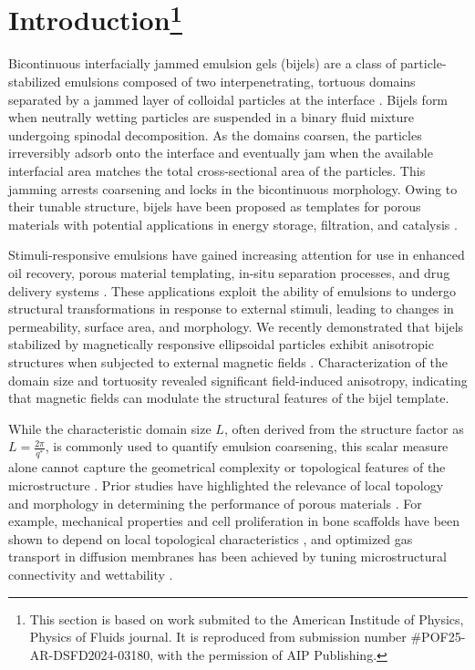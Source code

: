\section[Introduction]{Introduction\protect\footnote{This section is based on work submited to the American Institude of Physics, Physics of Fluids journal.
                        It is reproduced from submission number \#POF25-AR-DSFD2024-03180, with the permission of AIP Publishing.}}

Bicontinuous interfacially jammed emulsion gels (bijels) are a class of particle-stabilized emulsions composed of two interpenetrating, tortuous domains separated by a jammed layer of colloidal particles 
at the interface \cite{stratford_colloidal_2005, herzig_bicontinuous_2007, tavacoli_novel_2011}. Bijels form when neutrally wetting particles are suspended in a binary fluid mixture undergoing spinodal 
decomposition. As the domains coarsen, the particles irreversibly adsorb onto the interface and eventually jam when the available interfacial area matches the total cross-sectional area of the particles. 
This jamming arrests coarsening and locks in the bicontinuous morphology. Owing to their tunable structure, bijels have been proposed as templates for porous materials with potential applications in 
energy storage, filtration, and catalysis \cite{yabuno_preparation_2020, samdani_bicontinuous_2017, cha_bicontinuous_2019, garcia_scalable_2019, santiago_cordoba_aerobijels_2020}.

Stimuli-responsive emulsions have gained increasing attention for use in enhanced oil recovery, porous material templating, in-situ separation processes, and drug delivery systems 
\cite{tang_stimuli-responsive_2016, bago_rodriguez_capsules_2019, nakayama_stimuli-responsive_2018}. These applications exploit the ability of emulsions to undergo structural transformations in response 
to external stimuli, leading to changes in permeability, surface area, and morphology. We recently demonstrated that bijels stabilized by magnetically responsive ellipsoidal particles exhibit anisotropic 
structures when subjected to external magnetic fields \cite{karthikeyan_formation_2024}. Characterization of the domain size and tortuosity revealed significant field-induced anisotropy, indicating that 
magnetic fields can modulate the structural features of the bijel template.

While the characteristic domain size \(L\), often derived from the structure factor as \(L = \frac{2\pi}{q^*}\), is commonly used to quantify emulsion coarsening, this scalar measure alone cannot capture the 
geometrical complexity or topological features of the microstructure \cite{kendon_inertial_2001}. Prior studies have highlighted the relevance of local topology and morphology in determining the performance of 
porous materials \cite{liu_influence_2021, xiong_porosity_2024, shojaei_minimal_2022}. For example, mechanical properties and cell proliferation in bone scaffolds have been shown to depend on local topological 
characteristics \cite{xiong_porosity_2024}, and optimized gas transport in diffusion membranes has been achieved by tuning microstructural connectivity and wettability \cite{shojaei_minimal_2022}. 

